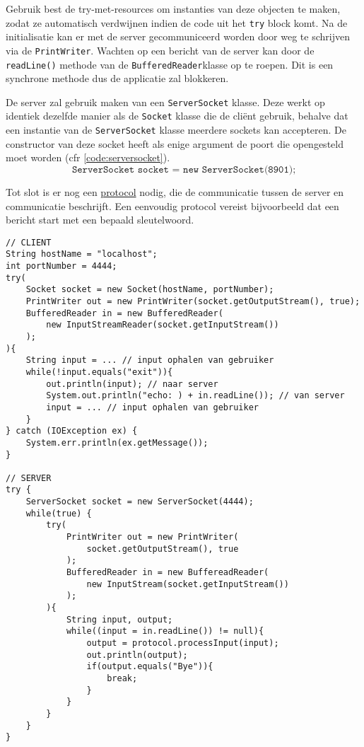\documentclass{report}
\begin{document}
 
 Gebruik best de try-met-resources om instanties van deze objecten te maken, zodat ze automatisch verdwijnen indien de code uit het \texttt{try} block komt. Na de initialisatie kan er met de server gecommuniceerd worden door weg te schrijven via de \texttt{PrintWriter}. Wachten op een bericht van de server kan door de \texttt{readLine()} methode van de \texttt{BufferedReader}klasse op te roepen. Dit is een synchrone methode dus de applicatie zal blokkeren. 

De server zal gebruik maken van een \texttt{ServerSocket} klasse. Deze werkt op identiek dezelfde manier als de \texttt{Socket} klasse die de cliënt gebruik, behalve dat een instantie van de \texttt{ServerSocket} klasse meerdere sockets kan accepteren. De constructor van deze socket heeft als enige argument de poort die opengesteld moet worden (cfr \ref{code:serversocket}).
\begin{equation}
	\texttt{ServerSocket socket = new ServerSocket(8901);}
	\label{code:serversocket}
\end{equation}

Tot slot is er nog een \underline{protocol} nodig, die de communicatie tussen de server en communicatie beschrijft. Een eenvoudig protocol vereist bijvoorbeeld dat een bericht start met een bepaald sleutelwoord. 

\begin{lstlisting}
// CLIENT
String hostName = "localhost";
int portNumber = 4444;
try(
    Socket socket = new Socket(hostName, portNumber);
    PrintWriter out = new PrintWriter(socket.getOutputStream(), true);
    BufferedReader in = new BufferedReader(
        new InputStreamReader(socket.getInputStream())
    );
){
    String input = ... // input ophalen van gebruiker
    while(!input.equals("exit")){
        out.println(input); // naar server
        System.out.println("echo: ) + in.readLine()); // van server
        input = ... // input ophalen van gebruiker
    }
} catch (IOException ex) {
    System.err.println(ex.getMessage());
}

// SERVER
try {
    ServerSocket socket = new ServerSocket(4444);
    while(true) {
        try(
            PrintWriter out = new PrintWriter(
                socket.getOutputStream(), true
            );
            BufferedReader in = new BuffereadReader(
                new InputStream(socket.getInputStream())
            );
        ){
            String input, output;
            while((input = in.readLine()) != null){
                output = protocol.processInput(input);
                out.println(output);
                if(output.equals("Bye")){
                    break;
                }
            }
        }
    }
}
\end{lstlisting}
\end{document}
